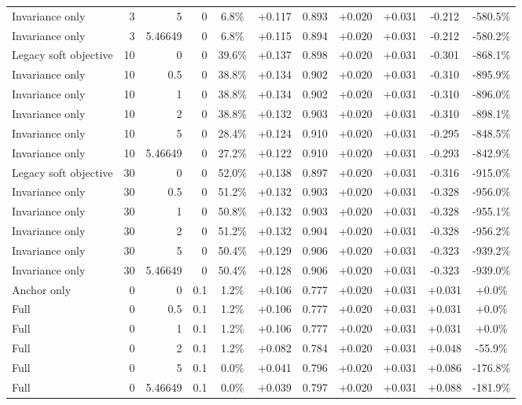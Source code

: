 \begin{table}[htbp]
\begin{tabular}{lrrrccccccc}
Invariance only & 3 & 5 & 0 & 6.8\% & +0.117 & 0.893 & +0.020 & +0.031 & -0.212 & -580.5\% \\
Invariance only & 3 & 5.46649 & 0 & 6.8\% & +0.115 & 0.894 & +0.020 & +0.031 & -0.212 & -580.2\% \\
Legacy soft objective & 10 & 0 & 0 & 39.6\% & +0.137 & 0.898 & +0.020 & +0.031 & -0.301 & -868.1\% \\
Invariance only & 10 & 0.5 & 0 & 38.8\% & +0.134 & 0.902 & +0.020 & +0.031 & -0.310 & -895.9\% \\
Invariance only & 10 & 1 & 0 & 38.8\% & +0.134 & 0.902 & +0.020 & +0.031 & -0.310 & -896.0\% \\
Invariance only & 10 & 2 & 0 & 38.8\% & +0.132 & 0.903 & +0.020 & +0.031 & -0.310 & -898.1\% \\
Invariance only & 10 & 5 & 0 & 28.4\% & +0.124 & 0.910 & +0.020 & +0.031 & -0.295 & -848.5\% \\
Invariance only & 10 & 5.46649 & 0 & 27.2\% & +0.122 & 0.910 & +0.020 & +0.031 & -0.293 & -842.9\% \\
Legacy soft objective & 30 & 0 & 0 & 52.0\% & +0.138 & 0.897 & +0.020 & +0.031 & -0.316 & -915.0\% \\
Invariance only & 30 & 0.5 & 0 & 51.2\% & +0.132 & 0.903 & +0.020 & +0.031 & -0.328 & -956.0\% \\
Invariance only & 30 & 1 & 0 & 50.8\% & +0.132 & 0.903 & +0.020 & +0.031 & -0.328 & -955.1\% \\
Invariance only & 30 & 2 & 0 & 51.2\% & +0.132 & 0.904 & +0.020 & +0.031 & -0.328 & -956.2\% \\
Invariance only & 30 & 5 & 0 & 50.4\% & +0.129 & 0.906 & +0.020 & +0.031 & -0.323 & -939.2\% \\
Invariance only & 30 & 5.46649 & 0 & 50.4\% & +0.128 & 0.906 & +0.020 & +0.031 & -0.323 & -939.0\% \\
Anchor only & 0 & 0 & 0.1 & 1.2\% & +0.106 & 0.777 & +0.020 & +0.031 & +0.031 & +0.0\% \\
Full & 0 & 0.5 & 0.1 & 1.2\% & +0.106 & 0.777 & +0.020 & +0.031 & +0.031 & +0.0\% \\
Full & 0 & 1 & 0.1 & 1.2\% & +0.106 & 0.777 & +0.020 & +0.031 & +0.031 & +0.0\% \\
Full & 0 & 2 & 0.1 & 1.2\% & +0.082 & 0.784 & +0.020 & +0.031 & +0.048 & -55.9\% \\
Full & 0 & 5 & 0.1 & 0.0\% & +0.041 & 0.796 & +0.020 & +0.031 & +0.086 & -176.8\% \\
Full & 0 & 5.46649 & 0.1 & 0.0\% & +0.039 & 0.797 & +0.020 & +0.031 & +0.088 & -181.9\% \\

\end{tabular}
\end{table}
